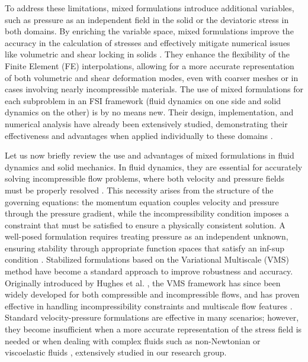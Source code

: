\documentclass[11pt,english]{article}
\begin{document}
To address these limitations, mixed formulations introduce additional variables, such as pressure as an independent field in the solid or the deviatoric stress in both domains. By enriching the variable space, mixed formulations improve the accuracy in the calculation of stresses and effectively mitigate numerical issues like volumetric and shear locking in solids \cite{aguirre2}. They enhance the flexibility of the Finite Element (FE) interpolations, allowing for a more accurate representation of both volumetric and shear deformation modes, even with coarser meshes or in cases involving nearly incompressible materials. The use of mixed formulations for each subproblem in an FSI framework (fluid dynamics on one side and solid dynamics on the other) is by no means new. Their design, implementation, and numerical analysis have already been extensively studied, demonstrating their effectiveness and advantages when applied individually to these domains \cite{BoffiBrezziFortin2013,CodinaCastanarBaiges2024,CodinaVMS}.

Let us now briefly review the use and advantages of mixed formulations in fluid dynamics and solid mechanics.
In fluid dynamics, they are essential for accurately solving incompressible flow problems, where both velocity and pressure fields must be properly resolved \cite{girault1986finite}. This necessity arises from the structure of the governing equations: the momentum equation couples velocity and pressure through the pressure gradient, while the incompressibility condition imposes a constraint that must be satisfied to ensure a physically consistent solution. A well-posed formulation requires treating pressure as an independent unknown, ensuring stability through appropriate function spaces that satisfy an inf-sup condition \cite{CodinaVMS,B-boffi-et-al}. Stabilized formulations based on the Variational Multiscale (VMS) method have become a standard approach to improve robustness and accuracy. Originally introduced by Hughes et al. \cite{hughes1998variational}, the VMS framework has since been widely developed for both compressible and incompressible flows, and has proven effective in handling incompressibility constraints and multiscale flow features \cite{CodinaOSS2002}. Standard velocity-pressure formulations are effective in many scenarios; however, they become insufficient when a more accurate representation of the stress field is needed or when dealing with complex fluids such as non-Newtonian or viscoelastic fluids \cite{ErnestoRamon2014,Moreno2019}, extensively studied in our research group.
\end{document}
